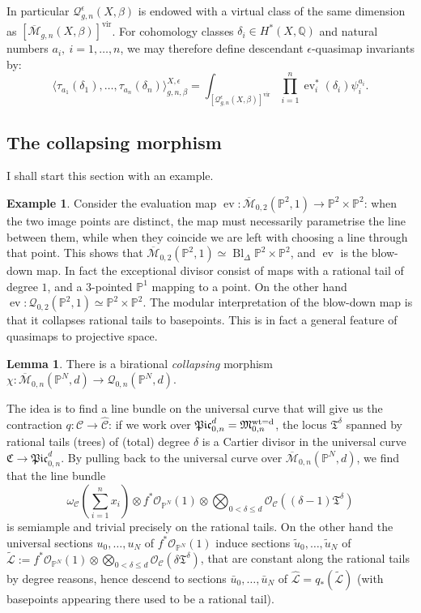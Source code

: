 \documentclass[11pt]{amsart}
\newcommand{\M}[4]{\overline{\mathcal{M}}_{#1,#2}(#3,#4)}
\newcommand{\Q}[4]{\mathcal{Q}_{#1,#2}(#3,#4)}
\newcommand{\Qe}[4]{\mathcal{Q}^{\epsilon}_{#1,#2}(#3,#4)}
\newcommand{\PP}{\mathbb P}
\newcommand{\QQ}{\mathbb{Q}}
\newcommand{\OO}{\mathcal{O}}
\renewcommand{\to}{\rightarrow}
\newcommand{\MM}{\mathfrak M}
\newcommand{\virt}[1]{[#1]^{\operatorname{vir}}}
\newcommand{\ev}{\operatorname{ev}}
\newcommand{\Bl}{\operatorname{Bl}}
\theoremstyle{definition}
\newtheorem{lem}[thm]{Lemma}
\theoremstyle{definition}
\newtheorem{ex}[thm]{Example}
\newcommand{\ilemph}[1]{\emph{#1}}
\begin{document}
In particular $\Qe{g}{n}{X}{\beta}$ is endowed with a virtual class of the same dimension as $\virt{\M{g}{n}{X}{\beta}}$. For cohomology classes $\delta_i\in H^*(X,\QQ)$ and natural numbers $a_i,\ i=1,\ldots,n$, we may therefore define descendant $\epsilon$-quasimap invariants by:
\[\langle \tau_{a_1}(\delta_1),\ldots,\tau_{a_n}(\delta_n)\rangle^{X,\epsilon}_{g,n,\beta}=\int_{\virt{\Qe{g}{n}{X}{\beta}}}\prod_{i=1}^n \ev_i^*(\delta_i)\psi_i^{a_i}.\]

\subsection{The collapsing morphism}\label{sec:collapsing} I shall start this section with an example.
\begin{ex}\label{ex:lines_in_p2}
 Consider the evaluation map $\ev\colon \M{0}{2}{\PP^2}{1}\to \PP^2\times\PP^2$: when the two image points are distinct, the map must necessarily parametrise the line between them, while when they coincide we are left with choosing a line through that point. This shows that $\M{0}{2}{\PP^2}{1}\simeq \Bl_{\Delta}\PP^2\times\PP^2$, and $\ev$ is the blow-down map. In fact the exceptional divisor consist of maps with a rational tail of degree $1$, and a $3$-pointed $\PP^1$ mapping to a point. On the other hand $\ev\colon \Q{0}{2}{\PP^2}{1}\simeq \PP^2\times\PP^2$. The modular interpretation of the blow-down map is that it collapses rational tails to basepoints. This is in fact a general feature of quasimaps to projective space.
\end{ex}

\begin{lem}
 There is a birational \ilemph{collapsing} morphism $\chi\colon \M{0}{n}{\PP^N}{d}\to \Q{0}{n}{\PP^N}{d}$.
\end{lem}

The idea is to find a line bundle on the universal curve that will give us the contraction $q\colon\mathcal C\to\hat{\mathcal C}$: if we work over $\mathfrak{Pic}^d_{0,n}=\MM_{0,n}^{\rm{wt}=d}$, the locus $\mathfrak T^\delta$ spanned by rational tails (trees) of (total) degree $\delta$ is a Cartier divisor in the universal curve $\mathfrak C\to\mathfrak{Pic}^d_{0,n}$. By pulling back to the universal curve over $\M{0}{n}{\PP^N}{d}$, we find that the line bundle \[\omega_\mathcal C\left(\sum_{i=1}^n x_i\right)\otimes f^*\OO_{\PP^N}(1)\otimes \bigotimes_{0<\delta\leq d}\OO_\mathcal C\left((\delta-1)\mathfrak T^\delta\right) \] is semiample and trivial precisely on the rational tails. On the other hand the universal sections $u_0,\ldots,u_N$ of $f^*\OO_{\PP^N}(1)$ induce sections $\tilde{u}_0,\ldots,\tilde{u}_N$ of $\tilde{\mathcal L}:=f^*\OO_{\PP^N}(1)\otimes \bigotimes_{0<\delta\leq d}\OO_\mathcal C\left(\delta\mathfrak T^\delta\right)$, that are constant along the rational tails by degree reasons, hence descend to sections $\bar{u}_0,\ldots,\bar{u}_N$ of $\hat{\mathcal L}=q_*(\tilde{\mathcal L})$ (with basepoints appearing there used to be a rational tail).
\end{document}
